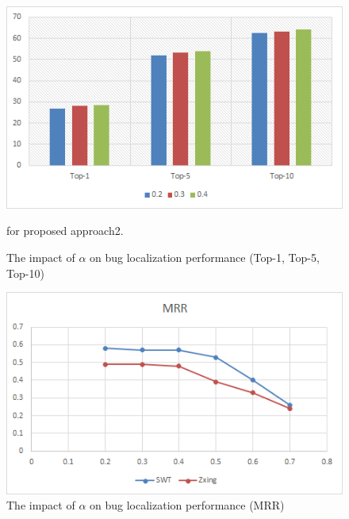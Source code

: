\documentclass[conference]{IEEEtran}
\begin{document}
\begin{figure}
	\centering
	\includegraphics[scale=0.80]{Performance-vsm+co}
	\caption{The impact of $\alpha$ on bug localization performance (Top-1, Top-5, Top-10)} for proposed approach2.
	\label{fig:PerformanceTopK2}
	\end{figure}

\begin{figure}
	\centering
	\includegraphics[scale=0.80]{MRR-SWT-Zxing}
	\caption{The impact of $\alpha$ on bug localization performance (MRR)}
	\label{fig:MRR}
\end{figure}
\end{document}
